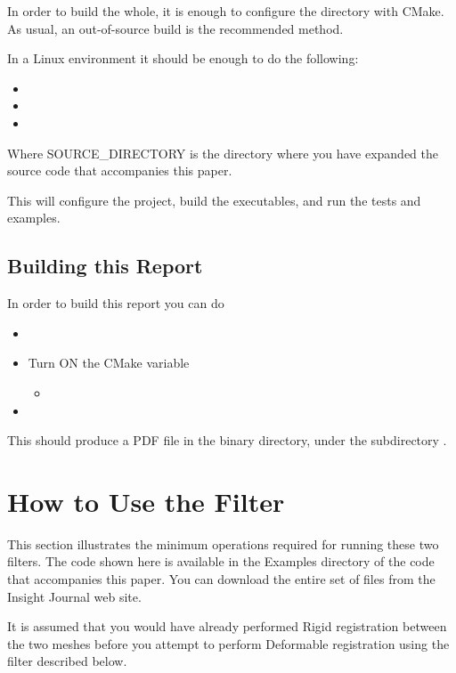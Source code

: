 \documentclass{InsightArticle}
\begin{document}
In order to build the whole, it is enough to configure the directory with
CMake. As usual, an out-of-source build is the recommended method.

In a Linux environment it should be enough to do the following:

\begin{itemize}
\item {}
\item {}
\item {}
\end{itemize}

Where SOURCE\_DIRECTORY is the directory where you have expanded the source
code that accompanies this paper.

This will configure the project, build the executables, and run the tests and
examples. 


\subsection{Building this Report}

In order to build this report you can do

\begin{itemize}
\item {}
\item Turn ON the CMake variable
\begin{itemize}
\item {}
\end{itemize}
\item {}
\end{itemize}

This should produce a PDF file in the binary directory, under the subdirectory
.

\section{How to Use the Filter}

This section illustrates the minimum operations required for running these two
filters. The code shown here is available in the Examples directory of the code
that accompanies this paper. You can download the entire set of files from the
Insight Journal web site.

It is assumed that you would have already performed Rigid registration between
the two meshes before you attempt to perform Deformable registration using the
filter described below.
\end{document}
